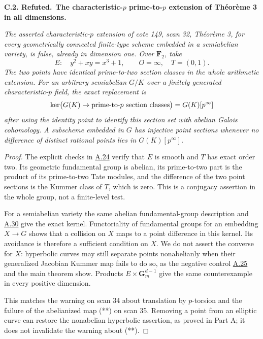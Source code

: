 \documentclass[11pt,a4paper]{article}
\newenvironment{claim}[3]{\par\medskip\noindent\hypertarget{#1}{\textbf{#1. #2.}}\ \textbf{#3.}\par\nopagebreak\smallskip\begingroup\itshape}{\endgroup\par\smallskip}
\newcommand{\statementref}[1]{\hyperlink{#1}{#1}}
\begin{document}
\begin{claim}{C.2}{Refuted}{The characteristic-$p$ prime-to-$p$ extension of Théorème 3 in all dimensions}
The asserted characteristic-$p$ extension of cote 149, scan 32,
Théorème 3, for every geometrically connected finite-type scheme
embedded in a semiabelian variety, is false, already in dimension
one. Over $\mathbf F_2$, take
\[
 E:\quad y^2+xy=x^3+1,\qquad O=\infty,\quad T=(0,1).
\]
The two points have identical prime-to-two section classes in
the whole arithmetic extension. For an arbitrary semiabelian
$G/K$ over a finitely generated characteristic-$p$ field, the
exact replacement is
\[
 \ker\bigl(G(K)\to\hbox{prime-to-}p\hbox{ section classes}\bigr)
       =G(K)[p^\infty]
\]
after using the identity point to identify this section set with
abelian Galois cohomology. A subscheme embedded in $G$ has
injective point sections whenever no difference of distinct
rational points lies in $G(K)[p^\infty]$.
\end{claim}
\begin{proof}
The explicit checks in \statementref{A.24} verify that $E$ is
smooth and $T$ has exact order two. Its geometric fundamental
group is abelian, its prime-to-two part is the product of its
prime-to-two Tate modules, and the difference of the two point
sections is the Kummer class of $T$, which is zero. This is a
conjugacy assertion in the whole group, not a finite-level test.

For a semiabelian variety the same abelian fundamental-group
description and \statementref{A.30} give the exact kernel.
Functoriality of fundamental groups for an embedding $X\to G$
shows that a collision on $X$ maps to a point difference in this
kernel. Its avoidance is therefore a sufficient condition on
$X$. We do not assert the converse for $X$: hyperbolic curves
may still separate points nonabelianly when their generalized
Jacobian Kummer map fails to do so, as the negative control
\statementref{A.25} and the main theorem show. Products
$E\times\mathbf G_m^{d-1}$ give the same counterexample in every
positive dimension.

This matches the warning on scan 34 about translation by
$p$-torsion and the failure of the abelianized map (**) on scan
35. Removing a point from an elliptic curve can restore the
nonabelian hyperbolic assertion, as proved in Part A; it does
not invalidate the warning about (**).
\end{proof}
\end{document}
